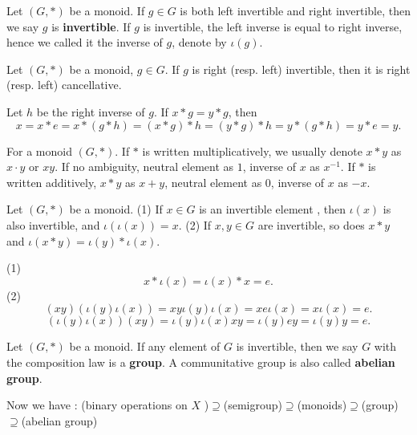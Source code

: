\documentclass{book}
\numberwithin{equation}{section}
\begin{document}
\begin{definitionenv}
    Let $(G, *)$ be a monoid. If $g\in G$ is both left invertible and right invertible,  then we say $g$ is \textbf{invertible}.
    If $g$ is invertible,  the left inverse is equal to right inverse,  hence we called it the inverse of $g$,  denote by $\iota(g)$.
\end{definitionenv}
\begin{propositionenv}
    Let $(G, *)$ be a monoid,  $g\in G$. If $g$ is right (resp. left) invertible,  then it is right (resp. left) cancellative.
\end{propositionenv}
\begin{proofenv}
    Let $h$ be the right inverse of $g$. If $x*g=y*g$,  then 
    $$x=x*e=x*(g*h)=(x*g)*h=(y*g)*h=y*(g*h)=y*e=y.$$
\end{proofenv}
\begin{notationenv}
    For a monoid $(G, *)$.
    \newline
    If $*$ is written multiplicatively,  we usually denote $x*y$ as $x\cdot y$ or $xy$. If no ambiguity,  neutral element as $1$, inverse of $x$ as $x^{-1}$.
    \newline
    If $*$ is written additively,  $x*y$ as $x+y$,  neutral element as $0$,  inverse of $x$ as $-x$.
\end{notationenv}
\begin{propositionenv}\label{proposition5.2.4}
    Let $(G, *)$ be a monoid.
    \newline
    (1) If $x\in G$ is an invertible element ,  then $\iota (x)$ is also invertible,  and $\iota(\iota(x))=x$.
    \newline
    (2) If $x, y\in G$ are invertible,  so does $x*y$ and $\iota(x*y)=\iota(y)*\iota(x)$.
\end{propositionenv}
\begin{proofenv}
    \quad\newline
    (1) $$x*\iota(x)=\iota(x)*x=e.$$
    (2) $$(xy)(\iota(y)\iota(x))=xy\iota(y)\iota(x)=xe\iota(x)=x\iota(x)=e.$$
    $$(\iota(y)\iota(x))(xy)=\iota(y)\iota(x)xy=\iota(y)ey=\iota(y)y=e.$$
\end{proofenv}
\begin{definitionenv}
    Let $(G, *)$ be a monoid. If any element of $G$ is invertible,  then we say $G$ with the composition law is a \textbf{group}. A communitative group is also called \textbf{abelian group}.
\end{definitionenv}
\begin{box2}
   Now we have : 
   \newline
   {\color{mlv} (binary operations on $X$ )$\supseteq$(semigroup)$\supseteq$(monoids)$\supseteq$(group)$\supseteq$(abelian group)}

\end{box2}
\end{document}
